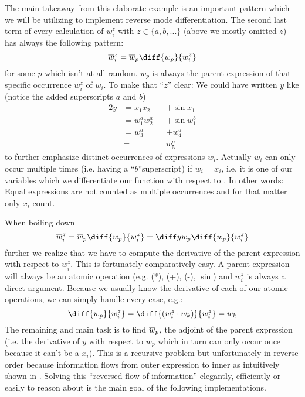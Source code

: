 The main takeaway from this elaborate \todowording example is an important pattern which we will be utilizing to implement reverse mode differentiation. The second last term of every calculation of $w_i^z$ with $z \in \{a, b, ...\}$ (above we mostly omitted $z$)  has always the following pattern:
\newcommand{\defoverwiz}{\overw{i}^z = \overw{p}\diff{w_p}{w_i^z}}
\[ \defoverwiz \]
for some $p$ which isn't at all random. $w_p$ is always the parent expression of that specific occurrence $w_i^z$ of $w_i$. To make that ``$z$'' clear: We could have written $y$ like (notice the added superscripts $a$ and $b$)
\begin{alignat*}{2}
    y & = x_1x_2 &  & + \sin{x_1} \\
      & = w_1^a w_2^a &  & + \sin{w_1^b} \\
      & = w_3^a    &  & + w_4^a       \\
      & =        &  & w_5^a
\end{alignat*}
to further emphasize distinct occurrences of expressions $w_i$. Actually $w_i$ can only occur multiple times (i.e. having a ``$b$''superscript) if $w_i = x_i$, i.e. it is one of our variables which we differentiate our function with respect to \todogrammar. In other words: Equal expressions are not counted as multiple occurrences and for that matter only $x_i$ count.

When boiling down
\[ \overw{i}^z = \overw{p}\diff{w_p}{w_i^z} = \diffyw{p}\diff{w_p}{w_i^z} \]
further we realize that we have to compute the derivative of the parent expression with respect to $w_i^z$. This is fortunately comparatively easy. A parent expression will always be an atomic operation (e.g. (*), (+), (-), $\sin$) and $w_i^z$ is always a direct argument. Because we usually know the derivative of each of our atomic operations, we can simply handle every case, e.g.:
\[ \diff{w_p}{w_i^z} = \diff{(w_i^z \cdot w_k)}{w_i^z} = w_k \]
The remaining and main task is to find $\overline{w}_{p}$, \todopunctuation the adjoint of the parent expression (i.e. the derivative of $y$ with respect to $w_p$ which in turn can only occur once because it can't be a $x_i$). This is a recursive problem but unfortunately in reverse order because information flows from outer expression to inner  as intuitively shown in  . Solving this ``reversed flow of information'' elegantly, efficiently or easily to reason about is the main goal of the following implementations. 



